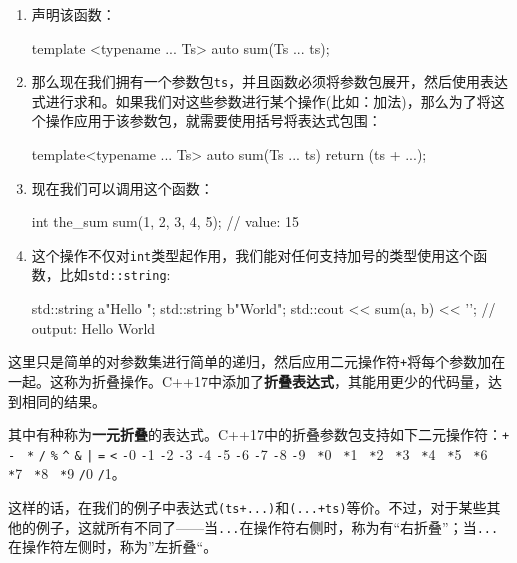 \begin{enumerate}
\item 声明该函数：

\begin{codebox}[cpp]
template <typename ... Ts>
auto sum(Ts ... ts);
\end{codebox}

\item 那么现在我们拥有一个参数包\texttt{ts}，并且函数必须将参数包展开，然后使用表达式进行求和。如果我们对这些参数进行某个操作(比如：加法)，那么为了将这个操作应用于该参数包，就需要使用括号将表达式包围：

\begin{codebox}[cpp]
template<typename ... Ts>
auto sum(Ts ... ts){
    return (ts + ...);
}
\end{codebox}

\item 现在我们可以调用这个函数：

\begin{codebox}[cpp]
int the_sum {sum(1, 2, 3, 4, 5)}; // value: 15
\end{codebox}

\item 这个操作不仅对\texttt{int}类型起作用，我们能对任何支持加号的类型使用这个函数，比如\texttt{std::string}:

\begin{codebox}[cpp]
std::string a{"Hello "};
std::string b{"World"};
std::cout << sum(a, b) << '\n'; // output: Hello World
\end{codebox}

\end{enumerate}


这里只是简单的对参数集进行简单的递归，然后应用二元操作符\texttt{+}将每个参数加在一起。这称为折叠操作。C++17中添加了\textbf{折叠表达式}，其能用更少的代码量，达到相同的结果。

其中有种称为\textbf{一元折叠}的表达式。C++17中的折叠参数包支持如下二元操作符：\texttt{+} \texttt{-} \texttt{ *} \texttt{/} \texttt{\%} \texttt{\textasciicircum{}} \texttt{\&} \texttt{|} \texttt{=} \texttt{<} \texttt{-}0 \texttt{-}1 \texttt{-}2 \texttt{-}3 \texttt{-}4 \texttt{-}5 \texttt{-}6 \texttt{-}7 \texttt{-}8 \texttt{-}9 \texttt{ *}0 \texttt{ *}1 \texttt{ *}2 \texttt{ *}3 \texttt{ *}4 \texttt{ *}5 \texttt{ *}6 \texttt{ *}7 \texttt{ *}8 \texttt{ *}9 \texttt{/}0 \texttt{/}1。

这样的话，在我们的例子中表达式\texttt{(ts+...)}和\texttt{(...+ts)}等价。不过，对于某些其他的例子，这就所有不同了——当\texttt{...}在操作符右侧时，称为有“右折叠”；当\texttt{...}在操作符左侧时，称为”左折叠“。

